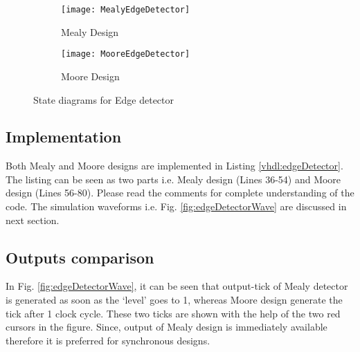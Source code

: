 \begin{figure}[h!]
	\centering
	\begin{subfigure}[t]{0.5\textwidth}
		\centering
		\texttt{[image: MealyEdgeDetector]}
		\caption{Mealy Design}
		\label{fig:MealyEdgeDetector}
	\end{subfigure}%
	\begin{subfigure}[t]{0.5\textwidth}
		\centering
		\texttt{[image: MooreEdgeDetector]}
		\caption{Moore Design}
		\label{fig:MooreEdgeDetector}
	\end{subfigure}
	
	\caption{State diagrams for Edge detector }
\end{figure}


%


\subsection{Implementation}
Both Mealy and Moore designs are implemented in Listing \ref{vhdl:edgeDetector}. The listing can be seen as two parts i.e. Mealy design (Lines 36-54) and Moore design (Lines 56-80). Please read the comments for complete understanding of the code. The simulation waveforms i.e. Fig. \ref{fig:edgeDetectorWave} are discussed in next section. 


\subsection{Outputs comparison}

In Fig. \ref{fig:edgeDetectorWave}, it can be seen that output-tick of Mealy detector is generated as soon as the `level' goes to 1, whereas Moore design generate the tick after 1 clock cycle. These two ticks are shown with the help of the two red cursors in the figure. Since, output of Mealy design is immediately available therefore it is preferred for synchronous designs. 

